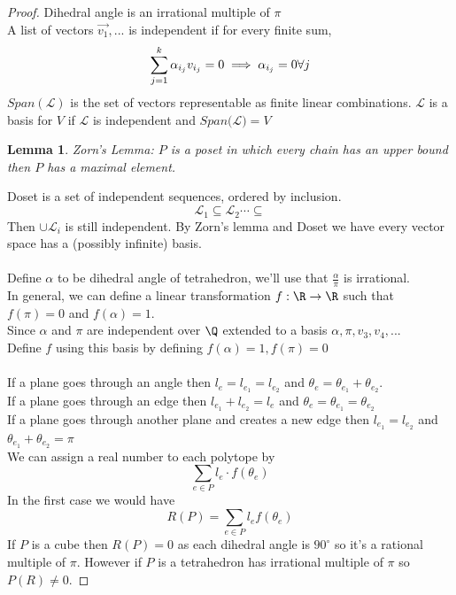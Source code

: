 \documentclass[a4paper]{article}
\newtheorem{lem}[thm]{Lemma}
\begin{document}
\begin{proof}
    Dihedral angle is an irrational multiple of $\pi$\\
    A list of vectors $\Vec{v_1},...$ is independent if for every finite sum, $$\sum_{j=1}^k\alpha_{i_j}v_{i_j}=0 \implies \alpha_{i_j}=0 \space \forall j$$
    $Span(\mathcal{L})$ is the set of vectors representable as finite linear combinations. $\mathcal{L}$ is a basis for $V$ if $\mathcal{L}$ is independent and $Span(\mathcal{L)}=V$
    \begin{lem}
        Zorn's Lemma: $P$ is a poset in which every chain has an upper bound then $P$ has a maximal element.
    \end{lem}
    \noindent Doset is a set of independent sequences, ordered by inclusion. 
    $$\mathcal{L}_1\subseteq \mathcal{L}_2\cdots\subseteq$$ Then $\cup{\mathcal{L}_i}$ is still independent. 
    By Zorn's lemma and Doset we have every vector space has a (possibly infinite) basis.\\\\
    Define $\alpha$ to be dihedral angle of tetrahedron, we'll use that $\frac{\alpha}{\pi}$ is irrational.\\
    In general, we can define a linear transformation $f:\R\to\R$ such that $f(\pi)=0$ and $f(\alpha)=1$.\\
    Since $\alpha$ and $\pi$ are independent over $\Q$ extended to a basis $\alpha, \pi, v_3,v_4,...$\\
    Define $f$ using this basis by defining $f(\alpha)=1,f(\pi)=0$\\\\
    If a plane goes through an angle then $l_e=l_{e_1}=l_{e_2}$ and $\theta_e=\theta_{e_1}+\theta_{e_2}$.\\
    If a plane goes through an edge then $l_{e_1}+l_{e_2}=l_e$ and $\theta_e=\theta_{e_1}=\theta_{e_2}$\\
    If a plane goes through another plane and creates a new edge then $l_{e_1}=l_{e_2}$ and $\theta_{e_1}+\theta_{e_2}=\pi$\\
    We can assign a real number to each polytope by $$\sum_{e\in P}l_e\cdot f(\theta_e)$$
    In the first case we would have $$R(P)=\sum_{e\in P}l_ef(\theta_e)$$
    If $P$ is a cube then $R(P)=0$ as each dihedral angle is $90^\circ$ so it's a rational multiple of $\pi.$ However if $P$ is a tetrahedron has irrational multiple of $\pi$ so $P(R)\neq 0$.
\end{proof}
\end{document}
